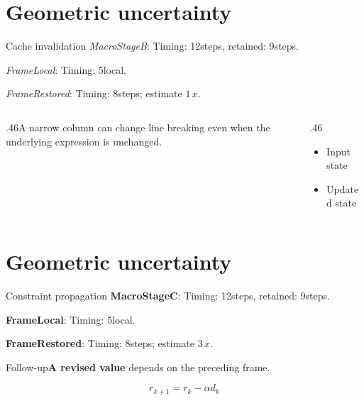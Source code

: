 \documentclass[9pt,aspectratio=169]{beamer}
\newcommand{\fuzzlayerA}[1]{\textit{#1}}
\newcommand{\fuzzlayerB}[1]{\fuzzlayerA{#1}}
\newcommand{\fuzzlayerC}[1]{\fuzzlayerB{#1}}
\newcommand{\fuzzterm}[1]{\fuzzlayerC{#1}}
\newcommand{\fuzzpair}[2]{\fuzzterm{#1}: #2}
\newcommand{\fuzzunit}{steps}
\let\fuzzoriginalunit\fuzzunit
\newcommand{\fuzzcoefficient}{1}
\newcommand{\fuzzscale}[2][\fuzzcoefficient]{#1\,#2}
\begin{document}
\section{Geometric uncertainty}
\begin{frame}[t]{Cache invalidation}
\fuzzpair{MacroStageB}{Timing: 12\fuzzunit, retained: 9\fuzzoriginalunit.}\par
{\renewcommand{\fuzzunit}{local}\fuzzpair{FrameLocal}{Timing: 5\fuzzunit.}\par}
\fuzzpair{FrameRestored}{Timing: 8\fuzzunit; estimate $\fuzzscale{x}$.}\par
\begin{columns}[T]\begin{column}{.46\textwidth}A narrow column can change line breaking even when the underlying expression is unchanged.\end{column}\begin{column}{.46\textwidth}\begin{itemize}\item Input state\item Updated state\end{itemize}\end{column}\end{columns}
\end{frame}
\renewcommand{\fuzzunit}{steps}
\renewcommand{\fuzzcoefficient}{3}
\renewcommand{\fuzzterm}[1]{{\textbf{#1}}}
\section{Geometric uncertainty}
\begin{frame}[t]{Constraint propagation}
\fuzzpair{MacroStageC}{Timing: 12\fuzzunit, retained: 9\fuzzoriginalunit.}\par
{\renewcommand{\fuzzunit}{local}\fuzzpair{FrameLocal}{Timing: 5\fuzzunit.}\par}
\fuzzpair{FrameRestored}{Timing: 8\fuzzunit; estimate $\fuzzscale{x}$.}\par
\begin{block}{Follow-up}\fuzzterm{A revised value} depends on the preceding frame.\end{block}
\[r_{k+1}=r_k-\alpha d_k\]
\end{frame}
\end{document}
